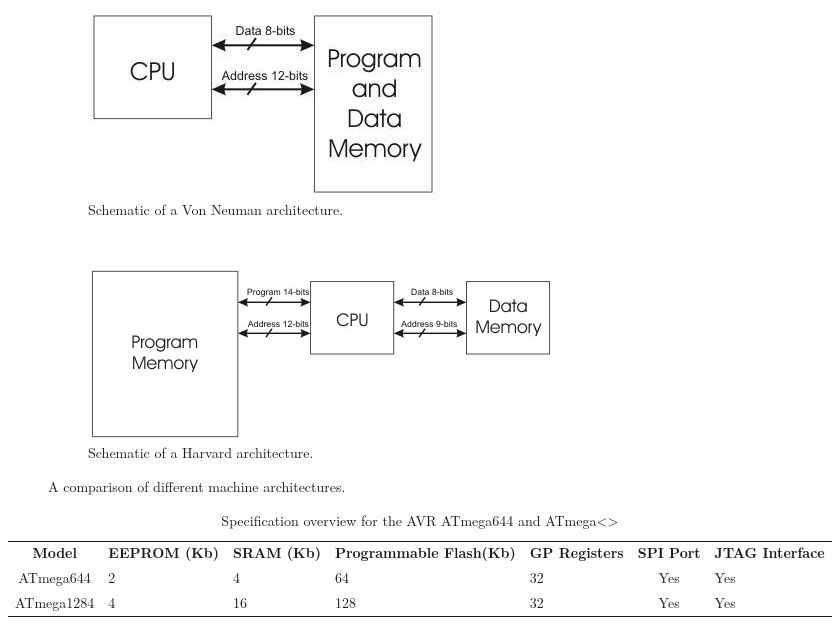 \documentclass[12pt,a4paper,twocolumn]{article}
\begin{document}
\begin{figure}
	\begin{subfigure}[b]{0.3\textwidth}
		\includegraphics[scale=0.65]{img/von_neuman_arch.jpg}
		\caption{Schematic of a Von Neuman architecture.}
		\label{fig:VN_arch}
	\end{subfigure} \\
	
	\begin{subfigure}[b]{0.3\textwidth}
		\includegraphics[scale=0.5]{img/harvard_arch.jpeg}
		\caption{Schematic of a Harvard architecture.}
		\label{fig:H_arch}
	\end{subfigure}
	\caption{A comparison of different machine architectures.}
	\label{fig:architectures}
\end{figure}	
		
	\begin{table}
		\begin{tabular}{| c | p{2cm} | p{1.5cm} | p{3cm} | p{2.8cm} | c | p{1.9cm} |}
		\textbf{Model} & \textbf{EEPROM (Kb)} & \textbf{SRAM (Kb)} & \textbf{Programmable Flash(Kb)} & \textbf{GP Registers} & \textbf{SPI Port} & \textbf{JTAG Interface}\\
		ATmega644 & 2 & 4 & 64 & 32 & Yes & Yes\\
		ATmega1284 & 4 & 16 & 128 & 32 & Yes & Yes \\
		
		
		\end{tabular}
	\caption{Specification overview for the AVR ATmega644 and ATmega<>}
	\label{table:avr_specs}
	\end{table}
	
\end{document}
